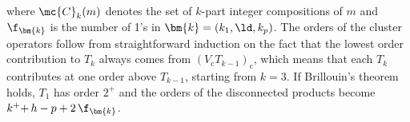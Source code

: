 \begin{rmk}
where $\mc{C}_k(m)$ denotes the set of $k$-part integer compositions of $m$
and $\f_{\bm{k}}$ is the number of 1's in
$
  \bm{k}
=
  (k_1,\ld,k_p)
$.
The orders of the cluster operators follow from straightforward induction on the fact that the lowest order contribution to $T_k$ always comes from
$
(
  V_{\text{c}}
  T_{k-1}
)_{\text{c}}
$,
which means that each $T_k$ contributes at one order above $T_{k-1}$, starting from $k=3$.
If Brillouin's theorem holds, $T_1$ has order $2^+$ and the orders of the disconnected products become ${k^+}{+}\,h-p+2\,\f_{\bm{k}}$.
\end{rmk}

